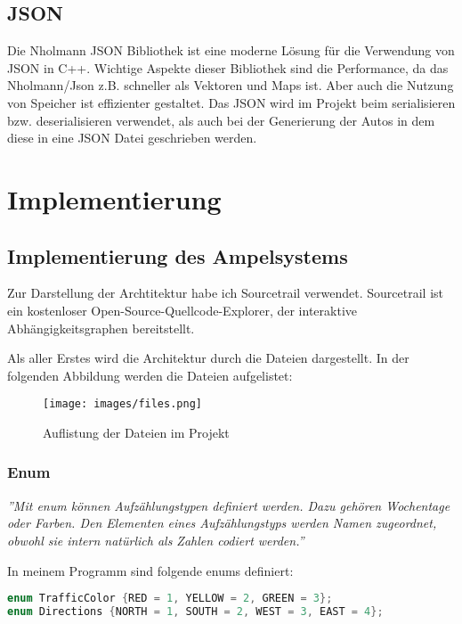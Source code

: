\documentclass[12pt, oneside]{article}
\begin{document}
\subsection{JSON}
Die Nholmann JSON Bibliothek ist eine moderne Lösung für die Verwendung von JSON in C++. Wichtige Aspekte dieser Bibliothek sind die Performance, da das Nholmann/Json z.B. schneller als Vektoren und Maps ist. Aber auch die Nutzung von Speicher ist effizienter gestaltet. Das JSON wird im Projekt beim serialisieren bzw. deserialisieren verwendet, als auch bei der Generierung der Autos in dem diese in eine JSON Datei geschrieben werden. \cite{Json}


\newpage
\section{Implementierung}
\subsection{Implementierung des Ampelsystems}
Zur Darstellung der Archtitektur habe ich Sourcetrail verwendet. Sourcetrail ist ein kostenloser Open-Source-Quellcode-Explorer, der interaktive Abhängigkeitsgraphen bereitstellt. \cite{Sourcetrail} \vspace{1em}

\noindent Als aller Erstes wird die Architektur durch die Dateien dargestellt. In der folgenden Abbildung werden die Dateien aufgelistet:

\begin{figure}[H]
    \centering
    \texttt{[image: images/files.png]} 
    \caption{Auflistung der Dateien im Projekt}
    \label{fig:files}
\end{figure}

\subsubsection{Enum}
\emph{''Mit enum können Aufzählungstypen definiert werden. Dazu gehören Wochentage oder Farben. Den Elementen eines Aufzählungstyps werden Namen zugeordnet, obwohl sie intern natürlich als Zahlen codiert werden.''}\cite{EnumDefinition} \vspace{1em}

\noindent In meinem Programm sind folgende enums definiert:\newline

\begin{lstlisting}[language=C++, caption={C++ enums.h}]
enum TrafficColor {RED = 1, YELLOW = 2, GREEN = 3};
enum Directions {NORTH = 1, SOUTH = 2, WEST = 3, EAST = 4};
\end{lstlisting}
\end{document}
